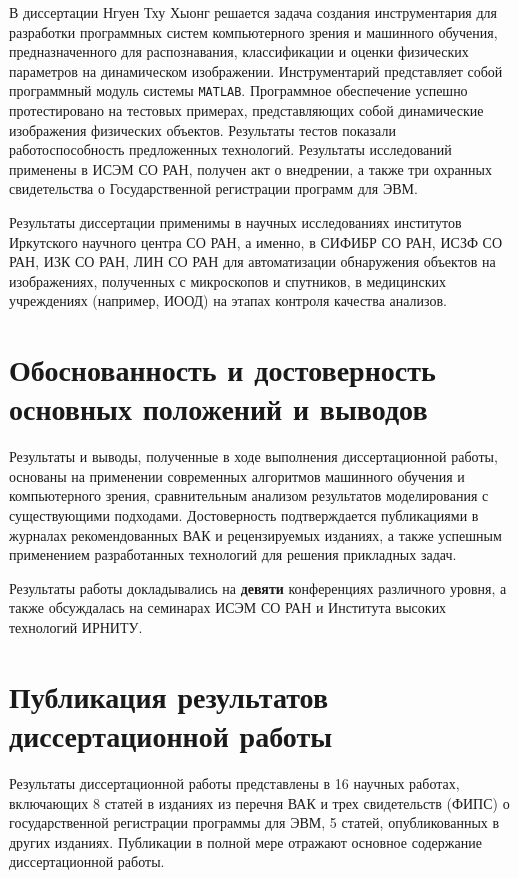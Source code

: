 \documentclass[12pt]{extarticle}
\begin{document}
В диссертации Нгуен Тху Хыонг решается задача создания инструментария для разработки программных систем компьютерного зрения и машинного обучения, предназначенного для распознавания, классификации и оценки физических параметров на динамическом изображении.  Инструментарий представляет собой %
программный модуль системы \texttt{MATLAB}.  Программное обеспечение успешно протестировано на тестовых примерах, представляющих собой динамические изображения физических объектов.  Результаты тестов показали работоспособность предложенных технологий.   Результаты исследований применены в ИСЭМ СО РАН, получен акт о внедрении, а также три охранных свидетельства о Государственной регистрации программ для ЭВМ.

Результаты диссертации применимы в научных исследованиях институтов Иркутского научного центра СО РАН, а именно, в СИФИБР СО РАН, ИСЗФ СО РАН, ИЗК СО РАН, ЛИН СО РАН для автоматизации обнаружения объектов на изображениях, полученных с микроскопов и спутников, в медицинских учреждениях (например, ИООД) на этапах контроля качества анализов.

\section{Обоснованность и достоверность основных положений и выводов}
\label{sec:verification}

Результаты и выводы, полученные в ходе выполнения диссертационной работы, основаны на применении современных алгоритмов машинного обучения и компьютерного зрения, сравнительным анализом результатов моделирования с существующими подходами.  Достоверность подтверждается публикациями в журналах рекомендованных ВАК и рецензируемых изданиях, а также успешным применением разработанных технологий для решения прикладных задач.

Результаты работы докладывались на \textbf{девяти} конференциях различного уровня, а также обсуждалась на семинарах ИСЭМ СО РАН и Института высоких технологий ИРНИТУ.

\section{Публикация результатов диссертационной работы}
\label{sec:publ}

Результаты диссертационной работы представлены в 16 научных работах, включающих 8 статей в изданиях из перечня ВАК и трех свидетельств (ФИПС) о государственной регистрации программы для ЭВМ, 5 статей, опубликованных в других изданиях.  Публикации в полной мере отражают основное содержание диссертационной работы.
\end{document}
